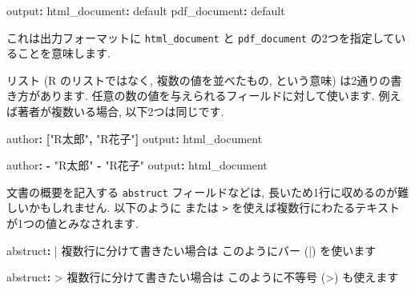 \documentclass[
]{ltjsarticle}
\newenvironment{Shaded}{\begin{snugshade}}{\end{snugshade}}
\newcommand{\AttributeTok}[1]{\textcolor[rgb]{0.77,0.63,0.00}{#1}}
\newcommand{\CharTok}[1]{\textcolor[rgb]{0.31,0.60,0.02}{#1}}
\newcommand{\FunctionTok}[1]{\textcolor[rgb]{0.00,0.00,0.00}{#1}}
\newcommand{\KeywordTok}[1]{\textcolor[rgb]{0.13,0.29,0.53}{\textbf{#1}}}
\newcommand{\NormalTok}[1]{#1}
\newcommand{\StringTok}[1]{\textcolor[rgb]{0.31,0.60,0.02}{#1}}
\begin{document}
\begin{Shaded}
\begin{Highlighting}[]
\FunctionTok{output}\KeywordTok{:}
\AttributeTok{  }\FunctionTok{html\_document}\KeywordTok{:}\AttributeTok{ default}
\AttributeTok{  }\FunctionTok{pdf\_document}\KeywordTok{:}\AttributeTok{ default}
\end{Highlighting}
\end{Shaded}

これは出力フォーマットに \texttt{html\_document} と \texttt{pdf\_document} の2つを指定していることを意味します.

リスト (R のリストではなく, 複数の値を並べたもの, という意味) は2通りの書き方があります. 任意の数の値を与えられるフィールドに対して使います. 例えば著者が複数いる場合, 以下2つは同じです.

\begin{Shaded}
\begin{Highlighting}[]
\FunctionTok{author}\KeywordTok{:}\AttributeTok{ }\KeywordTok{[}\StringTok{"R太郎"}\KeywordTok{,}\AttributeTok{ }\StringTok{"R花子"}\KeywordTok{]}
\FunctionTok{output}\KeywordTok{:}\AttributeTok{ html\_document}
\end{Highlighting}
\end{Shaded}

\begin{Shaded}
\begin{Highlighting}[]
\FunctionTok{author}\KeywordTok{:}
\AttributeTok{  }\KeywordTok{{-}}\AttributeTok{  }\StringTok{"R太郎"}
\AttributeTok{  }\KeywordTok{{-}}\AttributeTok{  }\StringTok{"R花子"}
\FunctionTok{output}\KeywordTok{:}\AttributeTok{ html\_document}
\end{Highlighting}
\end{Shaded}

文書の概要を記入する \texttt{abstruct} フィールドなどは, 長いため1行に収めるのが難しいかもしれません. 以下のように \texttt{\textbar{}} または \texttt{\textgreater{}} を使えば複数行にわたるテキストが1つの値とみなされます.

\begin{Shaded}
\begin{Highlighting}[]
\FunctionTok{abstruct}\KeywordTok{: }\CharTok{|}
\NormalTok{  複数行に分けて書きたい場合は}
\NormalTok{  このようにバー (\textasciigrave{}|\textasciigrave{}) を使います}
\end{Highlighting}
\end{Shaded}

\begin{Shaded}
\begin{Highlighting}[]
\FunctionTok{abstruct}\KeywordTok{: }\CharTok{\textgreater{}}
\NormalTok{  複数行に分けて書きたい場合は}
\NormalTok{  このように不等号 (\textasciigrave{}\textgreater{}\textasciigrave{}) も使えます}
\end{Highlighting}
\end{Shaded}
\end{document}
